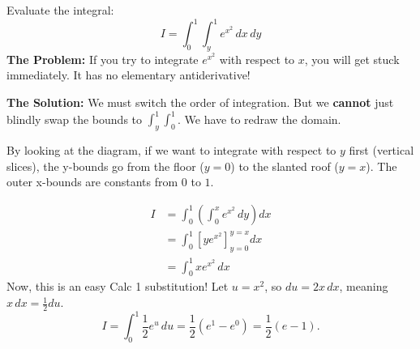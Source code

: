 \begin{example}
Evaluate the integral: 
\[
I = \int_0^1 \int_y^1 e^{x^2} \, dx \, dy
\]
\textbf{The Problem:} If you try to integrate $e^{x^2}$ with respect to $x$, you will get stuck immediately. It has no elementary antiderivative! 

\textbf{The Solution:} We must switch the order of integration. But we \textbf{cannot} just blindly swap the bounds to $\int_y^1 \int_0^1$. We have to redraw the domain.

\begin{center}
\end{center}

By looking at the diagram, if we want to integrate with respect to $y$ first (vertical slices), the y-bounds go from the floor ($y=0$) to the slanted roof ($y=x$). The outer x-bounds are constants from $0$ to $1$. 

\begin{align*}
I &= \int_0^1 \left( \int_0^x e^{x^2} \, dy \right) dx \\
&= \int_0^1 \left[ y e^{x^2} \right]_{y=0}^{y=x} dx \\
&= \int_0^1 x e^{x^2} \, dx
\end{align*}
Now, this is an easy Calc 1 substitution! Let $u = x^2$, so $du = 2x \, dx$, meaning $x \, dx = \frac{1}{2}du$.
\[
I = \int_0^1 \frac{1}{2} e^u \, du = \frac{1}{2}(e^1 - e^0) = \frac{1}{2}(e - 1).
\]
\end{example}


